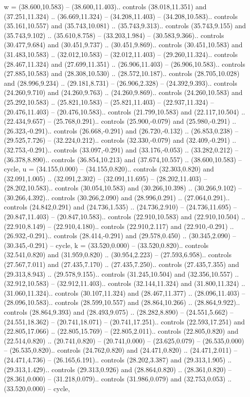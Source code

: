 {w} = {(38.600,10.583) -- (38.600,11.403).. controls (38.018,11.351) and (37.251,11.324) .. (36.669,11.324) -- (34.208,11.403) -- (34.208,10.583).. controls (35.161,10.557) and (35.743,10.081) .. (35.743,9.313).. controls (35.743,9.155) and (35.743,9.102) .. (35.610,8.758) -- (33.203,1.984) -- (30.583,9.366).. controls (30.477,9.684) and (30.451,9.737) .. (30.451,9.869).. controls (30.451,10.583) and (31.483,10.583) .. (32.012,10.583) -- (32.012,11.403) -- (29.260,11.324).. controls (28.467,11.324) and (27.699,11.351) .. (26.906,11.403) -- (26.906,10.583).. controls (27.885,10.583) and (28.308,10.530) .. (28.572,10.187).. controls (28.705,10.028) and (28.996,9.234) .. (29.181,8.731) -- (26.906,2.328) -- (24.392,9.393).. controls (24.260,9.710) and (24.260,9.763) .. (24.260,9.869).. controls (24.260,10.583) and (25.292,10.583) .. (25.821,10.583) -- (25.821,11.403) -- (22.937,11.324) -- (20.476,11.403) -- (20.476,10.583).. controls (21.799,10.583) and (22.117,10.504) .. (22.434,9.657) -- (25.768,0.291).. controls (25.900,-0.079) and (25.980,-0.291) .. (26.323,-0.291).. controls (26.668,-0.291) and (26.720,-0.132) .. (26.853,0.238) -- (29.525,7.726) -- (32.224,0.212).. controls (32.330,-0.079) and (32.409,-0.291) .. (32.753,-0.291).. controls (33.097,-0.291) and (33.176,-0.053) .. (33.282,0.212) -- (36.378,8.890).. controls (36.854,10.213) and (37.674,10.557) .. (38.600,10.583) -- cycle},
{u} = {(34.155,0.000) -- (34.155,0.820).. controls (32.303,0.820) and (32.091,1.005) .. (32.091,2.302) -- (32.091,11.695) -- (28.202,11.403) -- (28.202,10.583).. controls (30.054,10.583) and (30.266,10.398) .. (30.266,9.102) -- (30.266,4.392).. controls (30.266,2.090) and (28.996,0.291) .. (27.064,0.291).. controls (24.842,0.291) and (24.736,1.535) .. (24.736,2.910) -- (24.736,11.695) -- (20.847,11.403) -- (20.847,10.583).. controls (22.910,10.583) and (22.910,10.504) .. (22.910,8.149) -- (22.910,4.180).. controls (22.910,2.117) and (22.910,-0.291) .. (26.932,-0.291).. controls (28.414,-0.291) and (29.578,0.450) .. (30.345,2.090) -- (30.345,-0.291) -- cycle},
{k} = {(33.520,0.000) -- (33.520,0.820).. controls (32.541,0.820) and (31.959,0.820) .. (30.954,2.223) -- (27.593,6.958).. controls (27.567,7.011) and (27.435,7.170) .. (27.435,7.250).. controls (27.435,7.355) and (29.313,8.943) .. (29.578,9.155).. controls (31.245,10.504) and (32.356,10.557) .. (32.912,10.583) -- (32.912,11.403).. controls (32.144,11.324) and (31.800,11.324) .. (31.060,11.324).. controls (30.107,11.324) and (28.467,11.377) .. (28.096,11.403) -- (28.096,10.583).. controls (28.599,10.557) and (28.864,10.266) .. (28.864,9.922).. controls (28.864,9.393) and (28.493,9.075) .. (28.282,8.890) -- (24.551,5.662) -- (24.551,18.362) -- (20.741,18.071) -- (20.741,17.251).. controls (22.593,17.251) and (22.805,17.066) .. (22.805,15.769) -- (22.805,2.011).. controls (22.805,0.820) and (22.514,0.820) .. (20.741,0.820) -- (20.741,0.000) -- (23.625,0.079) -- (26.535,0.000) -- (26.535,0.820).. controls (24.762,0.820) and (24.471,0.820) .. (24.471,2.011) -- (24.471,4.736) -- (26.165,6.191).. controls (28.202,3.387) and (29.313,1.905) .. (29.313,1.429).. controls (29.313,0.926) and (28.864,0.820) .. (28.361,0.820) -- (28.361,0.000) -- (31.218,0.079).. controls (31.986,0.079) and (32.753,0.053) .. (33.520,0.000) -- cycle},
